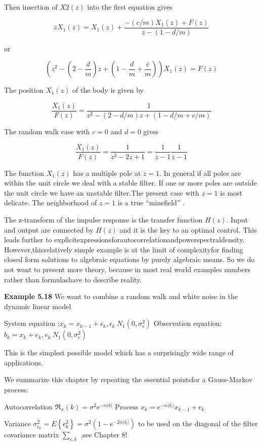   Then insertion of $ X2(z) $ into the first equation gives 
   
   \[ zX_{1}(z)=X_{1}(z)+\frac{-(c/m)X_{1}(z)+F(z)}{z-(1-d/m)} \]
   
   or
   
   \[ (z^{2}-(2-\frac{d}{m})z+(1-\frac{d}{m}+\frac{c}{m}))X_{1}(z)=F(z) \]
   
   The position $ X_{1}(z) $ of the body is given by
   
   \[ \frac{X_{1}(z)}{F(z)}=\frac{1}{z^{2}-(2-d/m)z+(1-d/m+c/m)} \]
   
   The random walk case with $ c=0 $ and $ d=0 $ gives
   
   \[ \frac{X_{1}(z)}{F(z)}=\frac{1}{z^{2}-2z+1}=\frac{1}{z-1}\frac{1}{z-1} \]
   
   The function $ X_{1}(z) $ has a multiple pole at $ z =1 $. In general if all poles are within the unit circle we deal with a stable filter. If one or more poles are outside the unit circle we have an unstable filter.The present case with $ z = 1 $ is most delicate. The neighborhood of $ z =1 $ is a true “minefield”  .
   
   The z-transform of the impulse response is the transfer function $ H (z) $. Input and output are connected by $ H (z) $ and it is the key to an optimal control. This leads further to explicitexpressionsforautocorrelationandpowerspectraldensity. However,thisrelatively simple example is at the limit of complexityfor finding closed form solutions to algebraic equations by purely algebraic means. So we do not want to present more theory, because in most real world examples numbers rather than formulashave to describe reality.
   
   \textbf{Example 5.18} We want to combine a random walk and white noise in the dynamic linear model 
   
   System equation :$ x_{k}=x_{k-1}+\epsilon_{k},\epsilon_{k}~N_{1}(0,\sigma_{\epsilon}^{2})$
   Observation equation:$ b_{k}=x_{k}+e_{k},e_{k}~N_{1}(0,\sigma_{e}^{2}) $
   
   This is the simplest possible model which has a surprisingly wide range of applications.
   
   We summarize this chapter by repeating the essential pointsfor a Gauss-Markov process: 
   
   Autocorrelation $ \Re_{x}(k)=\sigma^{2}e^{-\alpha|k|} $
   Process $ x_{k}=e^{-\alpha|\delta_{t}|}x_{k-1}+\epsilon_{k} $
   
   Variance $ \sigma_{\epsilon_{k}}^{2}=E\left\lbrace \epsilon_{k}^{2} \right\rbrace =\sigma^{2}(1-e^{-2\alpha|\delta_{t}|})$  to be used on the diagonal of the filter covariance matrix $ \sum\nolimits_{\epsilon,k} $ ,see Chapter 8!
   	